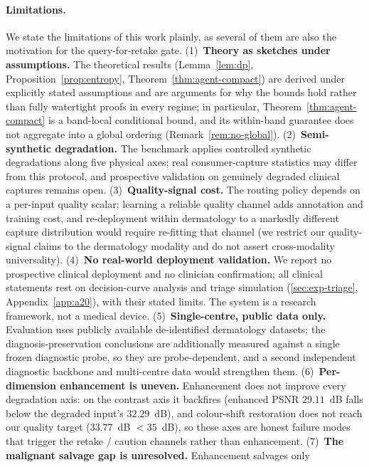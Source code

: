 \paragraph{Limitations.}
We state the limitations of this work plainly, as several of them are also the
motivation for the query-for-retake gate.
(1)~\textbf{Theory as sketches under assumptions.} The theoretical results
(Lemma~\ref{lem:dp}, Proposition~\ref{prop:entropy}, Theorem~\ref{thm:agent-compact}) are
derived under explicitly stated assumptions and are arguments for why the bounds hold
rather than fully watertight proofs in every regime; in particular,
Theorem~\ref{thm:agent-compact} is a band-local conditional bound, and its
within-band guarantee does not aggregate into a global ordering
(Remark~\ref{rem:no-global}).
(2)~\textbf{Semi-synthetic degradation.} The benchmark applies controlled synthetic
degradations along five physical axes; real consumer-capture statistics may differ
from this protocol, and prospective validation on genuinely degraded clinical captures
remains open.
(3)~\textbf{Quality-signal cost.} The routing policy depends on a per-input quality
scalar; learning a reliable quality channel adds annotation and training cost, and
re-deployment within dermatology to a markedly different capture distribution would
require re-fitting that channel (we restrict our quality-signal claims to the
dermatology modality and do not assert cross-modality universality).
(4)~\textbf{No real-world deployment validation.} We report no prospective clinical
deployment and no clinician confirmation; all clinical statements rest on
decision-curve analysis and triage simulation
(\cref{sec:exp-triage}, Appendix~\ref{app:a20}), with their stated limits. The system
is a research framework, not a medical device.
(5)~\textbf{Single-centre, public data only.} Evaluation uses publicly available
de-identified dermatology datasets; the diagnosis-preservation conclusions are
additionally measured against a single frozen diagnostic probe, so they are
probe-dependent, and a second independent diagnostic backbone and multi-centre data
would strengthen them.
(6)~\textbf{Per-dimension enhancement is uneven.} Enhancement does not improve every
degradation axis: on the contrast axis it backfires (enhanced PSNR $29.11$~dB falls
below the degraded input's $32.29$~dB), and colour-shift restoration does not reach our
quality target ($33.77$~dB $<35$~dB), so these axes are honest failure modes that
trigger the retake / caution channels rather than enhancement.
(7)~\textbf{The malignant salvage gap is unresolved.} Enhancement salvages only

